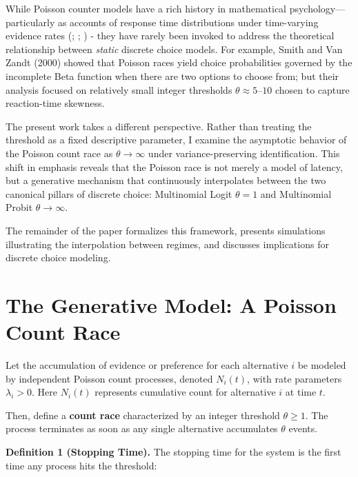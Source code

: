 \documentclass[
  man,
  floatsintext,
  longtable,
  a4paper,
  nolmodern,
  notxfonts,
  notimes,
  colorlinks=true,linkcolor=blue,citecolor=blue,urlcolor=blue]{apa7}
\begin{document}
While Poisson counter models have a rich history in mathematical
psychology---particularly as accounts of response time distributions
under time-varying evidence rates
(;
; ) - they have rarely been invoked to address the
theoretical relationship between \emph{static} discrete choice models.
For example, Smith and Van Zandt (2000) showed that Poisson races yield
choice probabilities governed by the incomplete Beta function when there
are two options to choose from; but their analysis focused on relatively
small integer thresholds \(\theta \approx 5\text{–}10\) chosen to
capture reaction-time skewness.

The present work takes a different perspective. Rather than treating the
threshold as a fixed descriptive parameter, I examine the asymptotic
behavior of the Poisson count race as \(\theta \to \infty\) under
variance-preserving identification. This shift in emphasis reveals that
the Poisson race is not merely a model of latency, but a generative
mechanism that continuously interpolates between the two canonical
pillars of discrete choice: Multinomial Logit \(\theta = 1\) and
Multinomial Probit \(\theta \to \infty\).

The remainder of the paper formalizes this framework, presents
simulations illustrating the interpolation between regimes, and
discusses implications for discrete choice modeling.

\section{The Generative Model: A Poisson Count
Race}\label{sec-generative-model}

Let the accumulation of evidence or preference for each alternative
\(i\) be modeled by independent Poisson count processes, denoted
\(N_i(t)\), with rate parameters \(\lambda_i > 0\). Here \(N_i(t)\)
represents cumulative count for alternative \(i\) at time \(t\).

Then, define a \textbf{count race} characterized by an integer threshold
\(\theta \ge 1\). The process terminates as soon as any single
alternative accumulates \(\theta\) events.

\textbf{Definition 1 (Stopping Time).} The stopping time for the system
is the first time any process hits the threshold:
\end{document}
